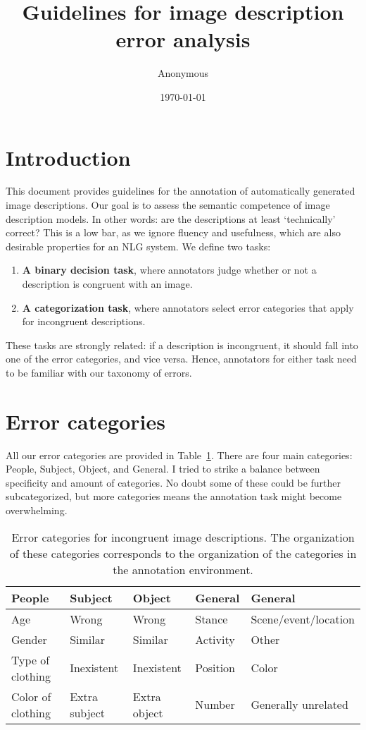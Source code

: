 \documentclass[11pt,a4paper]{article}
\begin{document}
\title{Guidelines for image description error analysis}
\author{Anonymous}
\date{\today}
\maketitle

\section{Introduction}
This document provides guidelines for the annotation of automatically generated image descriptions. Our goal is to assess the semantic competence of image description models. In other words: are the descriptions at least `technically' correct? This is a low bar, as we ignore fluency and usefulness, which are also desirable properties for an NLG system. We define two tasks: 
\begin{enumerate}
\item \textbf{A binary decision task}, where annotators judge whether or not a description is congruent with an image.
\item \textbf{A categorization task}, where annotators select error categories that apply for incongruent descriptions.
\end{enumerate}

These tasks are strongly related: if a description is incongruent, it should fall into one of the error categories, and vice versa. Hence, annotators for either task need to be familiar with our taxonomy of errors.

\section{Error categories}
All our error categories are provided in Table~\ref{table:categories}. There are four main categories: People, Subject, Object, and General. I tried to strike a balance between specificity and amount of categories. No doubt some of these could be further subcategorized, but more categories means the annotation task might become overwhelming.

\begin{table}[h!]
\centering
\begin{tabular}{lllll}
\toprule
People & Subject & Object & General & General \\
\midrule
Age & Wrong & Wrong & Stance & Scene/event/location\\
Gender & Similar & Similar & Activity & Other\\
Type of clothing & Inexistent & Inexistent & Position & Color\\
Color of clothing & Extra subject & Extra object & Number & Generally unrelated\\
\bottomrule
\end{tabular}
\caption{Error categories for incongruent image descriptions. The organization of these categories corresponds to the organization of the categories in the annotation environment.}
\label{table:categories}
\end{table}
\end{document}

